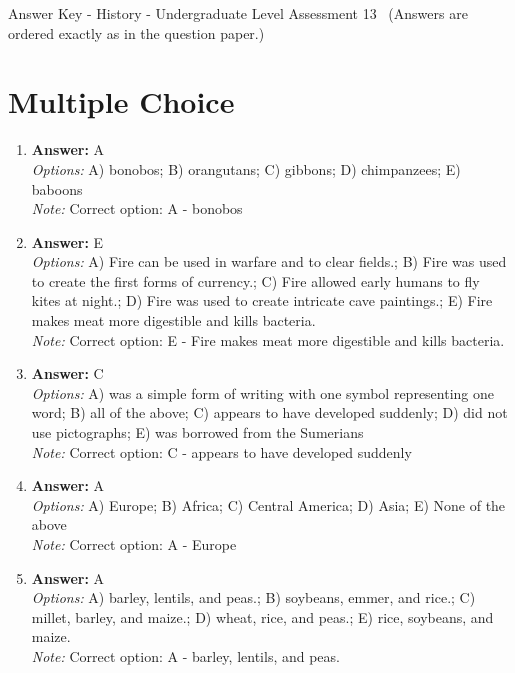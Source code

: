 \documentclass[12pt]{article}
\begin{document}
\begin{center}
Answer Key - History - Undergraduate Level Assessment 13 \
\small (Answers are ordered exactly as in the question paper.)
\end{center}

\section*{Multiple Choice}
\begin{enumerate}[label=\arabic*.]
\item \textbf{Answer:} A
\\ \textit{Options:} A) bonobos; B) orangutans; C) gibbons; D) chimpanzees; E) baboons
\\ \textit{Note:} Correct option: A - bonobos
\item \textbf{Answer:} E
\\ \textit{Options:} A) Fire can be used in warfare and to clear fields.; B) Fire was used to create the first forms of currency.; C) Fire allowed early humans to fly kites at night.; D) Fire was used to create intricate cave paintings.; E) Fire makes meat more digestible and kills bacteria.
\\ \textit{Note:} Correct option: E - Fire makes meat more digestible and kills bacteria.
\item \textbf{Answer:} C
\\ \textit{Options:} A) was a simple form of writing with one symbol representing one word; B) all of the above; C) appears to have developed suddenly; D) did not use pictographs; E) was borrowed from the Sumerians
\\ \textit{Note:} Correct option: C - appears to have developed suddenly
\item \textbf{Answer:} A
\\ \textit{Options:} A) Europe; B) Africa; C) Central America; D) Asia; E) None of the above
\\ \textit{Note:} Correct option: A - Europe
\item \textbf{Answer:} A
\\ \textit{Options:} A) barley, lentils, and peas.; B) soybeans, emmer, and rice.; C) millet, barley, and maize.; D) wheat, rice, and peas.; E) rice, soybeans, and maize.
\\ \textit{Note:} Correct option: A - barley, lentils, and peas.
\end{enumerate}
\end{document}
